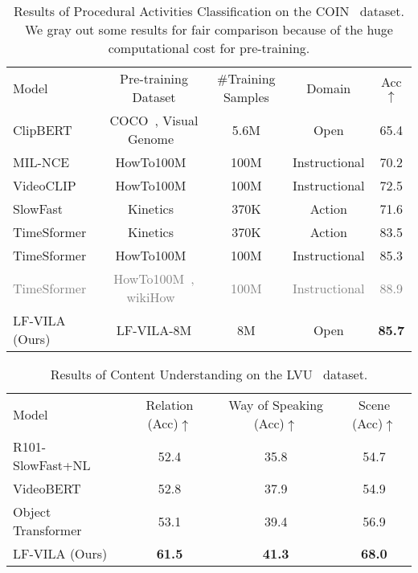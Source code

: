 \documentclass{article}
\begin{document}
\begin{table}[t]
    \small
    \centering
    \caption{Results of Procedural Activities Classification on the COIN~\cite{tang2019coin} dataset. We gray out some results for fair comparison because of the huge computational cost for pre-training.}
    \begin{tabular}{l c c c c} 
    \toprule
    Model & Pre-training Dataset & \#Training Samples &Domain & Acc$\uparrow$ \\
    \cmidrule{1-5}
    ClipBERT~\cite{lei2021clipbert} & COCO~\cite{chen2015mscoco}, Visual Genome~\cite{krishna2017visualgenome} & 5.6M  & Open & 65.4  \\
    MIL-NCE~\cite{miech2020milnce} &HowTo100M~\cite{miech2019howto100m} & 100M & Instructional & 70.2 \\
    VideoCLIP~\cite{xu2021videoclip} &HowTo100M~\cite{miech2019howto100m} & 100M & Instructional & 72.5  \\
    SlowFast~\cite{feichtenhofer2019slowfast} &Kinetics~\cite{carreira2017i3d-k600} &370K & Action & 71.6  \\
    TimeSformer~\cite{bertasius2021timesformer} &Kinetics~\cite{carreira2017i3d-k600} &370K & Action & 83.5 \\
    TimeSformer~\cite{bertasius2021timesformer} &HowTo100M~\cite{miech2019howto100m} & 100M  & Instructional & 85.3 \\
    \textcolor{gray}{TimeSformer~\cite{bertasius2021timesformer}} & \textcolor{gray}{HowTo100M~\cite{miech2019howto100m}, wikiHow~\cite{lin2022wikihow}} & \textcolor{gray}{100M}  & \textcolor{gray}{Instructional} & \textcolor{gray}{88.9}\\
    \cmidrule{1-5}
    LF-VILA (Ours)  &LF-VILA-8M & 8M & Open & \bf 85.7 \\
    \bottomrule
    \end{tabular}
    \label{tab:coin}
\end{table}


\begin{table}[t]
    \small
    \centering
    \caption{Results of Content Understanding on the LVU~\cite{wu2021towards-longform} dataset.}
    \begin{tabular}{l c c c} 
    \toprule
    Model & Relation (Acc)$\uparrow$ & Way of Speaking (Acc)$\uparrow$ & Scene (Acc)$\uparrow$ \\
    \cmidrule{1-4}
    R101-SlowFast+NL~\cite{feichtenhofer2019slowfast,he2016resnet,wang2018non-local} & 52.4 & 35.8 & 54.7  \\
    VideoBERT~\cite{sun2019videobert} & 52.8 & 37.9 & 54.9  \\
    Object Transformer~\cite{wu2021towards-longform} & 53.1 & 39.4 & 56.9 \\
    \cmidrule{1-4}
    LF-VILA (Ours)  & \bf 61.5 & \bf 41.3 & \bf 68.0   \\
    \bottomrule
    \end{tabular}
    \label{tab:lvu}
\end{table}
\end{document}
